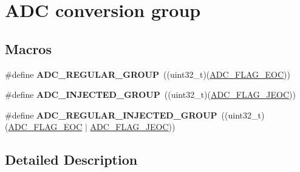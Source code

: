 \hypertarget{group___a_d_c__conversion__group}{\section{A\-D\-C conversion group}
\label{group___a_d_c__conversion__group}
}
\subsection*{Macros}
\begin{DoxyCompactItemize}
\item 
\hypertarget{group___a_d_c__conversion__group_ga5330c69e67bd145bcf413b153e4dbf81}{\#define {\bfseries A\-D\-C\-\_\-\-R\-E\-G\-U\-L\-A\-R\-\_\-\-G\-R\-O\-U\-P}~((uint32\-\_\-t)(\hyperlink{group___a_d_c__flags__definition_gaf2c6fdf7e9ab63b778149e5fb56413d4}{A\-D\-C\-\_\-\-F\-L\-A\-G\-\_\-\-E\-O\-C}))}\label{group___a_d_c__conversion__group_ga5330c69e67bd145bcf413b153e4dbf81}

\item 
\hypertarget{group___a_d_c__conversion__group_gaa4bd962bf44dede624f7174fbc2c1dfb}{\#define {\bfseries A\-D\-C\-\_\-\-I\-N\-J\-E\-C\-T\-E\-D\-\_\-\-G\-R\-O\-U\-P}~((uint32\-\_\-t)(\hyperlink{group___a_d_c__flags__definition_ga4df8eea8ab83d98104ee15a339743a4e}{A\-D\-C\-\_\-\-F\-L\-A\-G\-\_\-\-J\-E\-O\-C}))}\label{group___a_d_c__conversion__group_gaa4bd962bf44dede624f7174fbc2c1dfb}

\item 
\hypertarget{group___a_d_c__conversion__group_ga33c9e815701f0495ceb9f46a598dfb78}{\#define {\bfseries A\-D\-C\-\_\-\-R\-E\-G\-U\-L\-A\-R\-\_\-\-I\-N\-J\-E\-C\-T\-E\-D\-\_\-\-G\-R\-O\-U\-P}~((uint32\-\_\-t)(\hyperlink{group___a_d_c__flags__definition_gaf2c6fdf7e9ab63b778149e5fb56413d4}{A\-D\-C\-\_\-\-F\-L\-A\-G\-\_\-\-E\-O\-C} $\vert$ \hyperlink{group___a_d_c__flags__definition_ga4df8eea8ab83d98104ee15a339743a4e}{A\-D\-C\-\_\-\-F\-L\-A\-G\-\_\-\-J\-E\-O\-C}))}\label{group___a_d_c__conversion__group_ga33c9e815701f0495ceb9f46a598dfb78}

\end{DoxyCompactItemize}


\subsection{Detailed Description}
